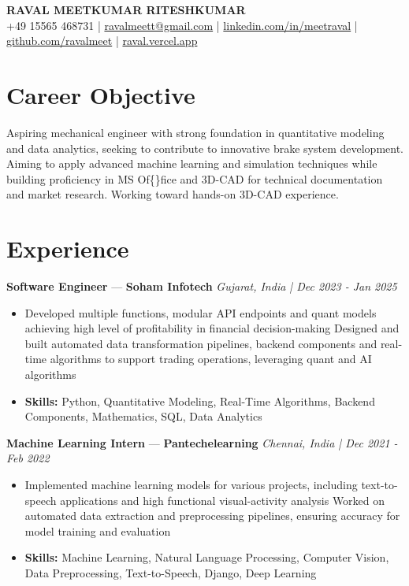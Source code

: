 \documentclass[a4paper,10pt]{article}
\begin{document}
\begin{center}
  {\Large\bfseries RAVAL MEETKUMAR RITESHKUMAR}\\[2pt]
  {\small +49 15565 468731 \;|\; \href{mailto:ravalmeett@gmail.com}{ravalmeett@gmail.com} \;|\; \href{https://www.linkedin.com/in/meetraval/}{linkedin.com/in/meetraval} \;|\; \href{https://github.com/ravalmeet}{github.com/ravalmeet} \;|\; \href{https://raval.vercel.app/}{raval.vercel.app}}
\end{center}
\vspace{-3pt}

\section*{Career Objective}
Aspiring mechanical engineer with strong foundation in quantitative modeling and data analytics, seeking to contribute to innovative brake system development. Aiming to apply advanced machine learning and simulation techniques while building proficiency in MS Of\{\}fice and 3D-CAD for technical documentation and market research. Working toward hands-on 3D-CAD experience.\par

\section*{Experience}
\textbf{Software Engineer} — \textbf{Soham Infotech} \hfill \textit{Gujarat, India \;|\; Dec 2023 - Jan 2025}\par
\vspace{1pt}
\begin{itemize}
  \item Developed multiple functions, modular API endpoints and quant models achieving high level of profitability in financial decision-making Designed and built automated data transformation pipelines, backend components and real-time algorithms to support trading operations, leveraging quant and AI algorithms
  \item \textbf{Skills:} Python, Quantitative Modeling, Real-Time Algorithms, Backend Components, Mathematics, SQL, Data Analytics
\end{itemize}
\vspace{3pt}
\textbf{Machine Learning Intern} — \textbf{Pantechelearning} \hfill \textit{Chennai, India \;|\; Dec 2021 - Feb 2022}\par
\vspace{1pt}
\begin{itemize}
  \item Implemented machine learning models for various projects, including text-to-speech applications and high functional visual-activity analysis Worked on automated data extraction and preprocessing pipelines, ensuring accuracy for model training and evaluation
  \item \textbf{Skills:} Machine Learning, Natural Language Processing, Computer Vision, Data Preprocessing, Text-to-Speech, Django, Deep Learning
\end{itemize}
\end{document}
